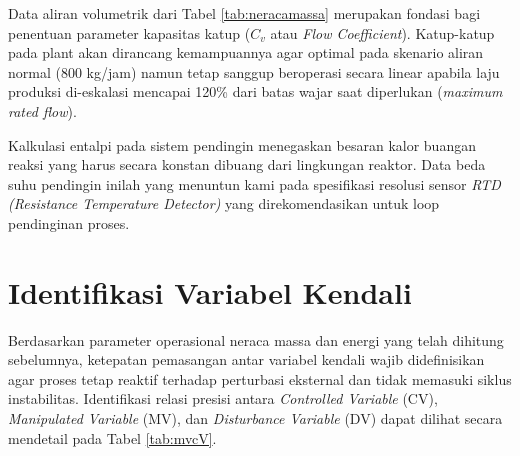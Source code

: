 \documentclass[12pt, a4paper]{report}
\begin{document}
Data aliran volumetrik dari Tabel \ref{tab:neracamassa} merupakan fondasi bagi penentuan parameter kapasitas katup ($C_v$ atau \textit{Flow Coefficient}). Katup-katup pada plant akan dirancang kemampuannya agar optimal pada skenario aliran normal (800 kg/jam) namun tetap sanggup beroperasi secara linear apabila laju produksi di-eskalasi mencapai 120\% dari batas wajar saat diperlukan (\textit{maximum rated flow}).

Kalkulasi entalpi pada sistem pendingin menegaskan besaran kalor buangan reaksi yang harus secara konstan dibuang dari lingkungan reaktor. Data beda suhu pendingin inilah yang menuntun kami pada spesifikasi resolusi sensor \textit{RTD (Resistance Temperature Detector)} yang direkomendasikan untuk loop pendinginan proses.

\section{Identifikasi Variabel Kendali}
Berdasarkan parameter operasional neraca massa dan energi yang telah dihitung sebelumnya, ketepatan pemasangan antar variabel kendali wajib didefinisikan agar proses tetap reaktif terhadap perturbasi eksternal dan tidak memasuki siklus instabilitas. Identifikasi relasi presisi antara \textit{Controlled Variable} (CV), \textit{Manipulated Variable} (MV), dan \textit{Disturbance Variable} (DV) dapat dilihat secara mendetail pada Tabel \ref{tab:mvcV}.

\begin{table}[htbp]
\centering
\caption{Identifikasi Variabel Kendali (CV, MV, DV) pada Proses ZXY}
\label{tab:mvcV}
\end{table}
\end{document}
